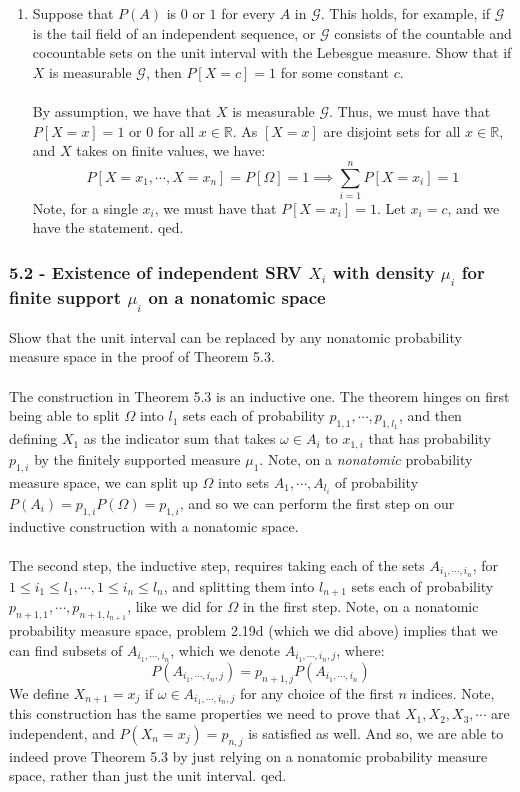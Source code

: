 \documentclass[12pt,a4paper]{article}
\newcommand{\1}[1]{\mathbbm{1}\left\{ #1 \right\}}
\newcommand{\R}{\mathbb{R}}
\newcommand{\gcal}{\mathcal{G}}
\begin{document}
\begin{enumerate}
	\item Suppose that $P(A)$ is $0$ or $1$ for every $A$ in $\gcal$. This holds, for example, if $\gcal$ is the tail field of an independent sequence, or $\gcal$ consists of the countable and cocountable sets on the unit interval with the Lebesgue measure. Show that if $X$ is measurable $\gcal$, then $P[X = c] = 1$ for some constant $c$.
	\\\\
	By assumption, we have that $X$ is measurable $\gcal$. Thus, we must have that $P[X = x] = 1$ or $0$ for all $x \in \R$. As $[X = x]$ are disjoint sets for all $x \in \R$, and $X$ takes on finite values, we have:
	$$
		P[X = x_1, \cdots, X = x_n] = P[\Omega] = 1 \implies
		\sum_{i=1}^n P[X = x_i] = 1
	$$
	Note, for a single $x_i$, we must have that $P[X = x_i] = 1$. Let $x_i = c$, and we have the statement. qed.
\end{enumerate}

\subsubsection{5.2 - Existence of independent SRV $X_i$ with density $\mu_i$ for finite support $\mu_i$ on a nonatomic space} Show that the unit interval can be replaced by any nonatomic probability measure space in the proof of Theorem 5.3.
\\\\
The construction in Theorem 5.3 is an inductive one. The theorem hinges on first being able to split $\Omega$ into $l_1$ sets each of probability $p_{1,1}, \cdots, p_{1,l_1}$, and then defining $X_1$ as the indicator sum that takes $\omega \in A_{i}$ to $x_{1,i}$ that has probability $p_{1,i}$ by the finitely supported measure $\mu_1$. Note, on a \textit{nonatomic} probability measure space, we can split up $\Omega$ into sets $A_{1}, \cdots, A_{l_i}$ of probability $P(A_{i}) = p_{1,i}P(\Omega) = p_{1,i}$, and so we can perform the first step on our inductive construction with a nonatomic space.
\\\\
The second step, the inductive step, requires taking each of the sets $A_{i_1, \cdots, i_n}$, for $1 \leq i_1 \leq l_1, \cdots, 1 \leq i_n \leq l_n$, and splitting them into $l_{n+1}$ sets each of probability $p_{n+1,1}, \cdots, p_{n+1,l_{n+1}}$, like we did for $\Omega$ in the first step. Note, on a nonatomic probability measure space, problem 2.19d (which we did above) implies that we can find subsets of $A_{i_1, \cdots, i_n}$, which we denote $A_{i_1, \cdots, i_n, j}$, where:
$$
	P(A_{i_1, \cdots, i_n, j}) = p_{n+1,j}P(A_{i_1, \cdots, i_n})
$$
We define $X_{n+1} = x_j$ if $\omega \in A_{i_1, \cdots, i_n, j}$ for any choice of the first $n$ indices. Note, this construction has the same properties we need to prove that $X_1, X_2, X_3, \cdots$ are independent, and $P(X_n = x_j) = p_{n,j}$ is satisfied as well. And so, we are able to indeed prove Theorem 5.3 by just relying on a nonatomic probability measure space, rather than just the unit interval. qed.
\end{document}
